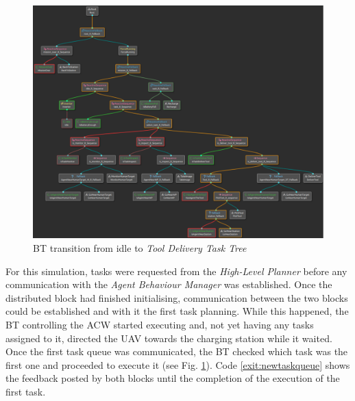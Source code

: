 \begin{figure}[htbp]
    \centering
    \includegraphics[width=.75\linewidth]{Results/figures/BTnoIdle.pdf}
    \caption{\gls{BT} transition from idle to \emph{Tool Delivery Task Tree}}
    \label{fig:NoIdle_DeliverToolTaskTree}
\end{figure}

For this simulation, tasks were requested from the \emph{High-Level Planner} before any communication with the \emph{Agent Behaviour Manager} was established. Once the distributed block had finished initialising, communication between the two blocks could be established and with it the first task planning. While this happened, the \gls{BT} controlling the \gls{ACW} started executing and, not yet having any tasks assigned to it, directed the \gls{UAV} towards the charging station while it waited. Once the first task queue was communicated, the \gls{BT} checked which task was the first one and proceeded to execute it (see Fig. \ref{fig:NoIdle_DeliverToolTaskTree}). Code \ref{exit:newtaskqueue} shows the feedback posted by both blocks until the completion of the execution of the first task.

